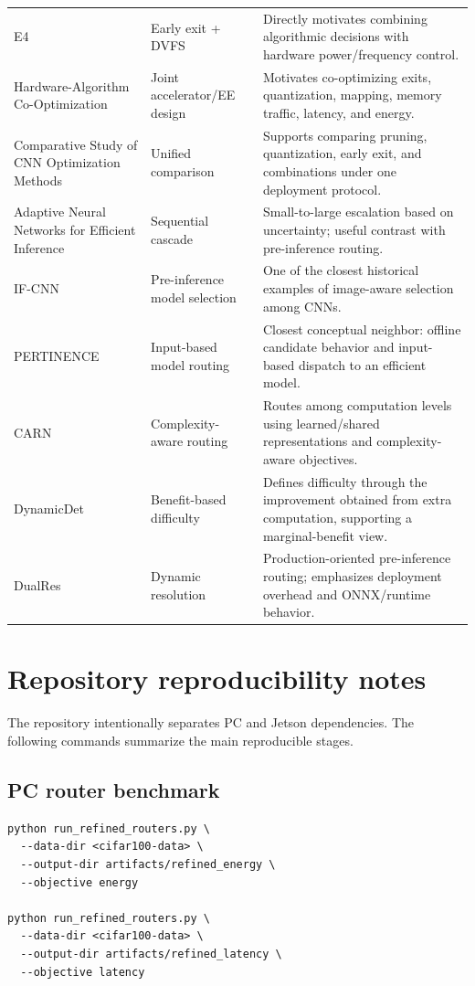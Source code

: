 \documentclass[11pt,a4paper]{article}
\begin{document}
\begin{longtable}{@{}p{}p{}p{}@{}}
E4 \cite{e4} & Early exit + DVFS & Directly motivates combining algorithmic decisions with hardware power/frequency control. \\
Hardware-Algorithm Co-Optimization \cite{zniber2026} & Joint accelerator/EE design & Motivates co-optimizing exits, quantization, mapping, memory traffic, latency, and energy. \\
Comparative Study of CNN Optimization Methods \cite{fernandez2026} & Unified comparison & Supports comparing pruning, quantization, early exit, and combinations under one deployment protocol. \\
Adaptive Neural Networks for Efficient Inference \cite{bolukbasi2017} & Sequential cascade & Small-to-large escalation based on uncertainty; useful contrast with pre-inference routing. \\
IF-CNN \cite{shu2018ifcnn} & Pre-inference model selection & One of the closest historical examples of image-aware selection among CNNs. \\
PERTINENCE \cite{shende2026pertinence} & Input-based model routing & Closest conceptual neighbor: offline candidate behavior and input-based dispatch to an efficient model. \\
CARN \cite{gaire2025carn} & Complexity-aware routing & Routes among computation levels using learned/shared representations and complexity-aware objectives. \\
DynamicDet \cite{dynamicdet} & Benefit-based difficulty & Defines difficulty through the improvement obtained from extra computation, supporting a marginal-benefit view. \\
DualRes \cite{dualres2026} & Dynamic resolution & Production-oriented pre-inference routing; emphasizes deployment overhead and ONNX/runtime behavior. \\
\bottomrule
\end{longtable}

\section{Repository reproducibility notes}
\label{app:repro}

The repository intentionally separates PC and Jetson dependencies. The following commands summarize the main reproducible stages.

\subsection{PC router benchmark}
\begin{lstlisting}
python run_refined_routers.py \
  --data-dir <cifar100-data> \
  --output-dir artifacts/refined_energy \
  --objective energy

python run_refined_routers.py \
  --data-dir <cifar100-data> \
  --output-dir artifacts/refined_latency \
  --objective latency
\end{lstlisting}
\end{document}
